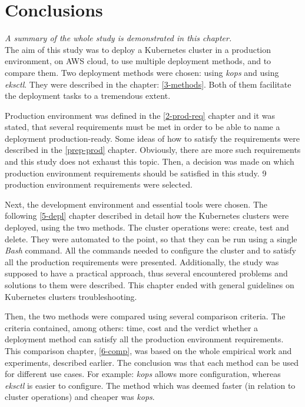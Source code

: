 \section{Conclusions}
\textit{A summary of the whole study is demonstrated in this chapter.}
\\

The aim of this study was to deploy a Kubernetes cluster in a production environment, on AWS cloud, to use multiple deployment methods, and to compare them. Two deployment methods were chosen: using \textit{kops} and using \textit{eksctl}. They were described in the chapter: \ref{3-methods}. Both of them facilitate the deployment tasks to a tremendous extent.

Production environment was defined in the \ref{2-prod-req} chapter and it was stated, that several requirements must be met in order to be able to name a deployment production-ready. Some ideas of how to satisfy the requirements were described in the \ref{prep-prod} chapter. Obviously, there are more such requirements and this study does not exhaust this topic. Then, a decision was made on which production environment requirements should be satisfied in this study. 9 production environment requirements were selected.

Next, the development environment and essential tools were chosen. The following \ref{5-depl} chapter described in detail how the Kubernetes clusters were deployed, using the two methods. The cluster operations were: create, test and delete. They were automated to the point, so that they can be run using a single \textit{Bash} command. All the commands needed to configure the cluster and to satisfy all the production requirements were presented. Additionally, the study was supposed to have a practical approach, thus several encountered problems and solutions to them were described. This chapter ended with general guidelines on Kubernetes clusters troubleshooting.

Then, the two methods were compared using several comparison criteria. The criteria contained, among others: time, cost and the verdict whether a deployment method can satisfy all the production environment requirements. This comparison chapter, \ref{6-comp}, was based on the whole empirical work and experiments, described earlier. The conclusion was that each method can be used for different use cases. For example: \textit{kops} allows more configuration, whereas \textit{eksctl} is easier to configure. The method which was deemed faster (in relation to cluster operations) and cheaper was \textit{kops}.

